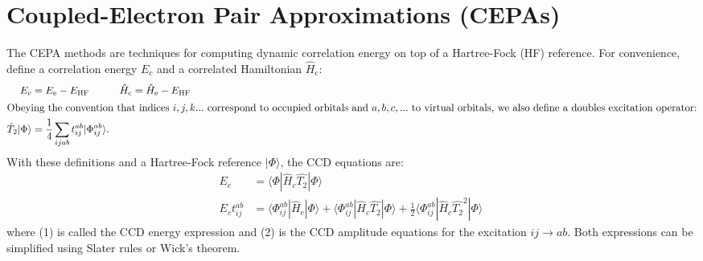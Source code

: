 \documentclass{article}[11pt]
\begin{document}
\section*{Coupled-Electron Pair Approximations (CEPAs)}
The CEPA methods are techniques for computing dynamic correlation energy on top of a Hartree-Fock (HF) reference. For convenience, define a correlation energy $E_{{c}}$ and a correlated Hamiltonian $\hat{H}_{\mathrm{c}}$:
\begin{align*}
E_{{c}} &= E_{\mathrm{e}} - E_{\mathrm{HF}}   &&  \hat{H}_{\mathrm{c}} = \hat{H}_{\mathrm{e}} - E_{\mathrm{HF}} \\
\intertext{Obeying the convention that indices $i,j,k...$ correspond to occupied orbitals and $a,b,c,...$ to virtual orbitals, we also define a doubles excitation operator:}
\hat{T}_2 | \Phi \rangle &= \frac{1}{4}\sum\limits_{ijab} t_{ij}^{ab} | \Phi_{ij}^{ab} \rangle.
\end{align*}
With these definitions and a Hartree-Fock reference $| \Phi \rangle$, the CCD equations are:
\begin{align}
   E_c 
&= 
	\langle \Phi |
      \hat{H}_c
      \hat{T_2}
   | \Phi \rangle
\\
   E_c
   t_{ij}^{ab}
&=
     \langle
   	  \Phi_{ij}^{ab} |
      \hat{H}_c 
   | \Phi \rangle
+
   \langle \Phi_{ij}^{ab} |
      \hat{H}_c
      \hat{T_2}
   | \Phi \rangle
+ 
   \frac{1}{2}
   \langle \Phi_{ij}^{ab}
     | \hat{H}_c
      \hat{T_2}^2 |
    \Phi \rangle \
\end{align}
where (1) is called the CCD energy expression and (2) is the CCD amplitude equations for the excitation $ij\rightarrow ab$. Both expressions can be simplified using Slater rules or Wick's theorem. 
\end{document}
